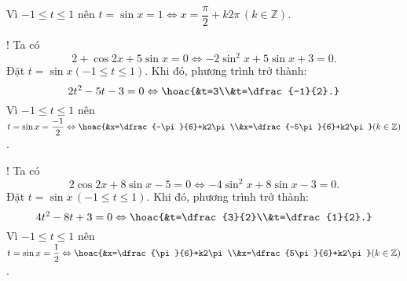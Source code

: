\begin{bt}
{\begin{listEX}[2]
$$			$$
			Vì $-1\le t\le 1$ nên $t=\sin{x}=1\Leftrightarrow x=\dfrac{\pi}{2}+k2\pi\,(k\in\mathbb{Z})$.
			\item! Ta có
			$$
			2+\cos{2x}+5\sin{x}=0 \Leftrightarrow -2\sin^2{x}+5\sin{x}+3=0.
			$$
			Đặt $t=\sin{x}(-1\le t\le 1)$. Khi đó, phương trình trở thành:
			$$
			2t^2-5t-3=0 \Leftrightarrow \hoac{&t=3\\&t=\dfrac{-1}{2}.}
			$$
			Vì $-1\le t\le 1$ nên $t=\sin{x}=\dfrac{-1}{2}\Leftrightarrow\hoac{&x=\dfrac{-\pi}{6}+k2\pi\\&x=\dfrac{-5\pi}{6}+k2\pi}(k\in\mathbb{Z})$.
			\item! Ta có
			$$
			2\cos{2x}+8\sin{x}-5=0 \Leftrightarrow -4\sin^2{x}+8\sin{x}-3=0.
			$$
			Đặt $t=\sin{x}\,(-1\le t\le 1)$. Khi đó, phương trình trở thành:
			$$
			4t^2-8t+3=0 \Leftrightarrow \hoac{&t=\dfrac{3}{2}\\&t=\dfrac{1}{2}.}
			$$
			Vì $-1\le t\le 1$ nên $t=\sin{x}=\dfrac{1}{2}\Leftrightarrow\hoac{&x=\dfrac{\pi}{6}+k2\pi\\&x=\dfrac{5\pi}{6}+k2\pi}(k\in\mathbb{Z})$.
		\end{listEX}
	}
\end{bt}



